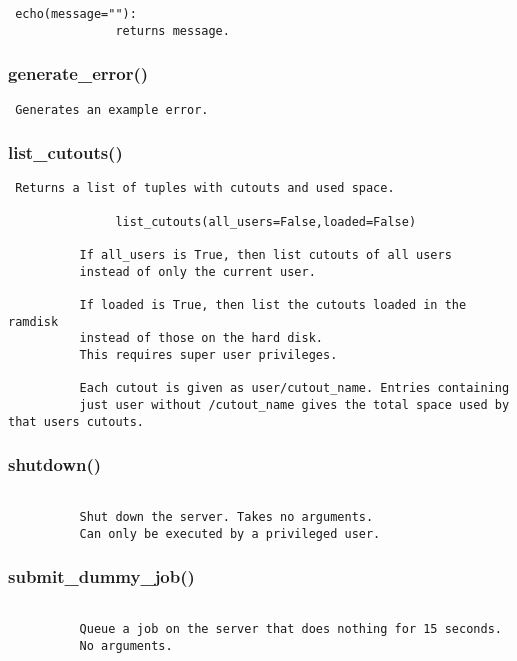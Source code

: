 \begin{verbatim}
 echo(message=""):
               returns message. 
\end{verbatim}
\subsubsection{generate\_error()}


\begin{verbatim}
 Generates an example error. 
\end{verbatim}
\subsubsection{list\_cutouts()}


\begin{verbatim}
 Returns a list of tuples with cutouts and used space.
          
               list_cutouts(all_users=False,loaded=False)

          If all_users is True, then list cutouts of all users
          instead of only the current user.

          If loaded is True, then list the cutouts loaded in the ramdisk
          instead of those on the hard disk.
          This requires super user privileges.

          Each cutout is given as user/cutout_name. Entries containing
          just user without /cutout_name gives the total space used by that users cutouts. 
\end{verbatim}
\subsubsection{shutdown()}


\begin{verbatim}

          Shut down the server. Takes no arguments. 
          Can only be executed by a privileged user. 
\end{verbatim}
\subsubsection{submit\_dummy\_job()}


\begin{verbatim}
 
          Queue a job on the server that does nothing for 15 seconds.
          No arguments.
          
\end{verbatim}
